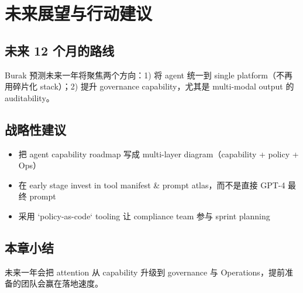 \section{未来展望与行动建议}

\subsection{未来 12 个月的路线}

Burak 预测未来一年将聚焦两个方向：1) 将 agent 统一到 single platform（不再用碎片化 stack）；2) 提升 governance capability，尤其是 multi-modal output 的 auditability。

\subsection{战略性建议}

\begin{itemize}
    \item 把 agent capability roadmap 写成 multi-layer diagram（capability + policy + Ops）
    \item 在 early stage invest in tool manifest \& prompt atlas，而不是直接 GPT-4 最终 prompt
    \item 采用 `policy-as-code` tooling 让 compliance team 参与 sprint planning
\end{itemize}

\subsection{本章小结}

未来一年会把 attention 从 capability 升级到 governance 与 Operations，提前准备的团队会赢在落地速度。

